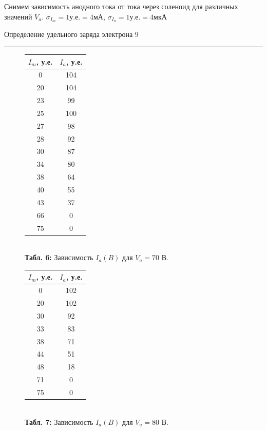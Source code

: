 \documentclass[12pt,a4paper]{scrartcl}
\begin{document}
Снимем зависимость анодного тока от тока через соленоид для различных значений $V_a$. $\sigma_{I_m}=1 \text{у.е.} = 4 \text{мА}$, $\sigma_{I_a}=1 \text{у.е.} = 4 \text{мкА}$

	\newpage
	
	\begin{flushleft}
		\footnotesize{Определение удельного заряда электрона} \hspace{\fill} \footnotesize{9}
		\\[-0.3cm]\noindent\rule{\textwidth}{0.3pt}
	\end{flushleft}
	
	\begin{figure}[h]
	\begin{minipage}{0.5\linewidth}
	\begin{center}
\begin{tabular}{|c|c|}
\hline
$I_m$, у.е. & $I_a$, у.е. \\ \hline
0 & 104  \\ \hline
20 & 104  \\ \hline
23 & 99  \\ \hline
25 & 100  \\ \hline
27 & 98  \\ \hline
28 & 92  \\ \hline
30 & 87  \\ \hline
34 & 80  \\ \hline
38 & 64  \\ \hline
40 & 55  \\ \hline
43 & 37  \\ \hline
66 & 0  \\ \hline
75 & 0  \\ \hline
\end{tabular}\\
\textbf{Табл. 6:} Зависимость $I_a(B)$ для $V_a = 70 $ В.
\end{center}
	\end{minipage}
	\begin{minipage}{0.5\linewidth}
	\begin{center}
\begin{tabular}{|c|c|}
\hline
$I_m$, у.е. & $I_a$, у.е. \\ \hline
0 & 102  \\ \hline
20 & 102  \\ \hline
30 & 92  \\ \hline
33 & 83  \\ \hline
38 & 71  \\ \hline
44 & 51  \\ \hline
48 & 18  \\ \hline
71 & 0  \\ \hline
75 & 0  \\ \hline
\end{tabular}\\
\textbf{Табл. 7:} Зависимость $I_a(B)$ для $V_a = 80$ В.
\end{center}
	\end{minipage}
	\end{figure}
	
\end{document}
